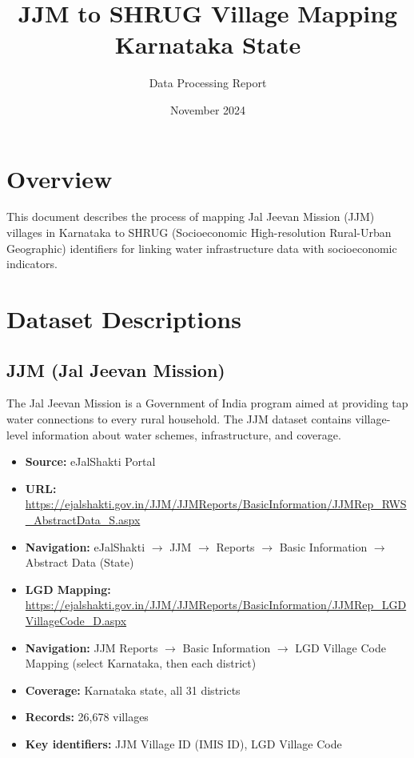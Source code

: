 \documentclass[11pt,a4paper]{article}
\title{JJM to SHRUG Village Mapping\\Karnataka State}
\author{Data Processing Report}
\date{November 2024}
\begin{document}
\maketitle

\section{Overview}

This document describes the process of mapping Jal Jeevan Mission (JJM) villages in Karnataka to SHRUG (Socioeconomic High-resolution Rural-Urban Geographic) identifiers for linking water infrastructure data with socioeconomic indicators.

\section{Dataset Descriptions}

\subsection{JJM (Jal Jeevan Mission)}
The Jal Jeevan Mission is a Government of India program aimed at providing tap water connections to every rural household. The JJM dataset contains village-level information about water schemes, infrastructure, and coverage.

\begin{itemize}
    \item \textbf{Source:} eJalShakti Portal
    \item \textbf{URL:} \url{https://ejalshakti.gov.in/JJM/JJMReports/BasicInformation/JJMRep_RWS_AbstractData_S.aspx}
    \item \textbf{Navigation:} eJalShakti $\rightarrow$ JJM $\rightarrow$ Reports $\rightarrow$ Basic Information $\rightarrow$ Abstract Data (State)
    \item \textbf{LGD Mapping:} \url{https://ejalshakti.gov.in/JJM/JJMReports/BasicInformation/JJMRep_LGDVillageCode_D.aspx}
    \item \textbf{Navigation:} JJM Reports $\rightarrow$ Basic Information $\rightarrow$ LGD Village Code Mapping (select Karnataka, then each district)
    \item \textbf{Coverage:} Karnataka state, all 31 districts
    \item \textbf{Records:} 26,678 villages
    \item \textbf{Key identifiers:} JJM Village ID (IMIS ID), LGD Village Code
\end{itemize}
\end{document}
